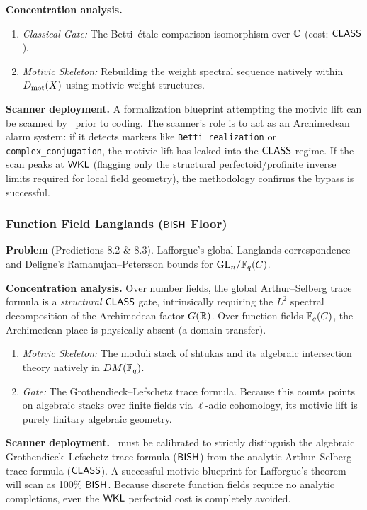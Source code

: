 \medskip
\noindent\textbf{Concentration analysis.}
\begin{enumerate}[nosep,label=(\roman*)]
\item \emph{Classical Gate:} The Betti--\'etale comparison isomorphism over $\mathbb{C}$ (cost: $\textsf{CLASS}$).
\item \emph{Motivic Skeleton:} Rebuilding the weight spectral sequence natively within $D_{\mathrm{mot}}(X)$ using motivic weight structures.
\end{enumerate}

\noindent\textbf{Scanner deployment.} A formalization blueprint attempting the motivic lift can be scanned by \CRMlint\ prior to coding. The scanner's role is to act as an Archimedean alarm system: if it detects markers like \texttt{Betti\_realization} or \texttt{complex\_conjugation}, the motivic lift has leaked into the $\textsf{CLASS}$ regime. If the scan peaks at $\textsf{WKL}$ (flagging only the structural perfectoid/profinite inverse limits required for local field geometry), the methodology confirms the bypass is successful.

\subsubsection{Function Field Langlands ($\textsf{BISH}$ Floor)}\label{sec:predict-function}

\noindent\textbf{Problem} (Predictions 8.2 \& 8.3). Lafforgue's global Langlands correspondence and Deligne's Ramanujan--Petersson bounds for $\mathrm{GL}_n/\mathbb{F}_q(C)$.

\medskip
\noindent\textbf{Concentration analysis.} Over number fields, the global Arthur--Selberg trace formula is a \emph{structural} $\textsf{CLASS}$ gate, intrinsically requiring the $L^2$ spectral decomposition of the Archimedean factor $G(\mathbb{R})$. Over function fields $\mathbb{F}_q(C)$, the Archimedean place is physically absent (a domain transfer).

\begin{enumerate}[nosep,label=(\roman*)]
\item \emph{Motivic Skeleton:} The moduli stack of shtukas and its algebraic intersection theory natively in $DM(\mathbb{F}_q)$.
\item \emph{Gate:} The Grothendieck--Lefschetz trace formula. Because this counts points on algebraic stacks over finite fields via $\ell$-adic cohomology, its motivic lift is purely finitary algebraic geometry.
\end{enumerate}

\noindent\textbf{Scanner deployment.} \CRMlint\ must be calibrated to strictly distinguish the algebraic Grothendieck--Lefschetz trace formula ($\textsf{BISH}$) from the analytic Arthur--Selberg trace formula ($\textsf{CLASS}$). A successful motivic blueprint for Lafforgue's theorem will scan as 100\% $\textsf{BISH}$. Because discrete function fields require no analytic completions, even the $\textsf{WKL}$ perfectoid cost is completely avoided.

